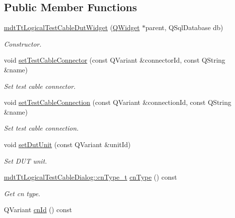 \subsection*{Public Member Functions}
\begin{DoxyCompactItemize}
\item 
\hyperlink{classmdt_tt_logical_test_cable_dut_widget_a0b4994d59497cc276180923914358391}{mdt\-Tt\-Logical\-Test\-Cable\-Dut\-Widget} (\hyperlink{class_q_widget}{Q\-Widget} $\ast$parent, Q\-Sql\-Database db)
\begin{DoxyCompactList}\small\item\em Constructor. \end{DoxyCompactList}\item 
void \hyperlink{classmdt_tt_logical_test_cable_dut_widget_a5aae77f249ae1fd251aae29e82517d7a}{set\-Test\-Cable\-Connector} (const Q\-Variant \&connector\-Id, const Q\-String \&name)
\begin{DoxyCompactList}\small\item\em Set test cable connector. \end{DoxyCompactList}\item 
void \hyperlink{classmdt_tt_logical_test_cable_dut_widget_afe3e657176c698cec7aa7fb70ba11cea}{set\-Test\-Cable\-Connection} (const Q\-Variant \&connection\-Id, const Q\-String \&name)
\begin{DoxyCompactList}\small\item\em Set test cable connection. \end{DoxyCompactList}\item 
void \hyperlink{classmdt_tt_logical_test_cable_dut_widget_afe9ac9845afc941d264bbe23c01e2675}{set\-Dut\-Unit} (const Q\-Variant \&unit\-Id)
\begin{DoxyCompactList}\small\item\em Set D\-U\-T unit. \end{DoxyCompactList}\item 
\hyperlink{classmdt_tt_logical_test_cable_dialog_a3ca0cca0e179adbc5d6a024eb8ec00f8}{mdt\-Tt\-Logical\-Test\-Cable\-Dialog\-::cn\-Type\-\_\-t} \hyperlink{classmdt_tt_logical_test_cable_dut_widget_a71aa2a709acc41657bd1ca0762f79d7b}{cn\-Type} () const 
\begin{DoxyCompactList}\small\item\em Get cn type. \end{DoxyCompactList}\item 
Q\-Variant \hyperlink{classmdt_tt_logical_test_cable_dut_widget_a1cabba0b94b634268f93717b05c3a70d}{cn\-Id} () const 

\end{DoxyCompactItemize}
